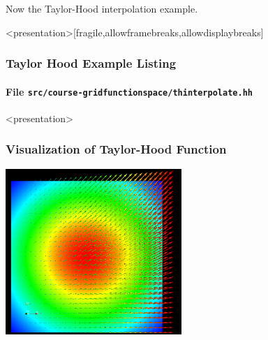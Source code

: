 Now the Taylor-Hood interpolation example.

\begin{frame}<presentation>[fragile,allowframebreaks,allowdisplaybreaks]
\frametitle<presentation>{Taylor Hood Example Listing}
\framesubtitle<presentation>{File \texttt{src/course-gridfunctionspace/thinterpolate.hh}}

\end{frame}

\begin{frame}<presentation>
\frametitle<presentation>{Visualization of Taylor-Hood Function}
\begin{center}
\includegraphics[width=0.5\textwidth]{./EPS/thinterpolate}
\end{center}
\end{frame}


